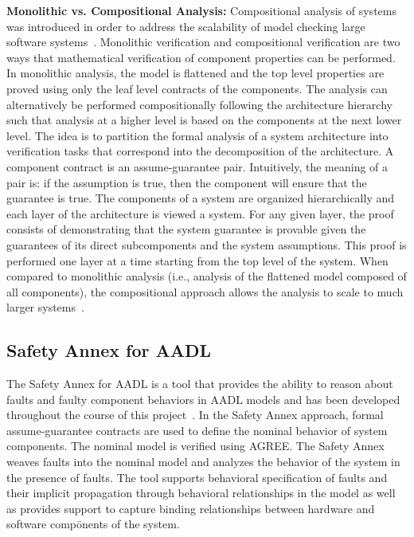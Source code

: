 \textbf{Monolithic vs. Compositional Analysis:} Compositional analysis of systems was introduced in order to address the scalability of model checking large software systems~\cite{pnueli1985transition, heckel1998compositional, NFM2012:CoGaMiWhLaLu}. Monolithic verification and compositional verification are two ways that mathematical verification of component properties can be performed. In monolithic analysis, the model is flattened and the top level properties are proved using only the leaf level contracts of the components. The analysis can alternatively be performed compositionally following the architecture hierarchy such that analysis at a higher level is based on the components at the next lower level. The idea is to partition the formal analysis of a system architecture into verification tasks that correspond into the decomposition of the architecture. A component contract is an assume-guarantee pair. Intuitively, the meaning of a pair is: if the assumption is true, then the component will ensure that the guarantee is true. The components of a system are organized hierarchically and each layer of the architecture is viewed a system. For any given layer, the proof consists of demonstrating that the system guarantee is provable given the guarantees of its direct subcomponents and the system assumptions. This proof is performed one layer at a time starting from the top level of the system. When compared to monolithic analysis (i.e., analysis of the flattened model composed of all components), the compositional approach allows the analysis to scale to much larger systems~\cite{NFM2012:CoGaMiWhLaLu}. 

\subsection{Safety Annex for AADL}
The Safety Annex for AADL is a tool that provides the ability to reason about faults and faulty component behaviors in AADL models and has been developed throughout the course of this project~\cite{Stewart17:IMBSA,SATechReport, stewart2020safety, nasaFinalReport}. In the Safety Annex approach, formal assume-guarantee contracts are used to define the nominal behavior of system components. The nominal model is verified using AGREE. The Safety Annex weaves faults into the nominal model and analyzes the behavior of the system in the presence of faults. The tool supports behavioral specification of faults and their implicit propagation through behavioral relationships in the model as well as provides support to capture binding relationships between hardware and software compönents of the system.